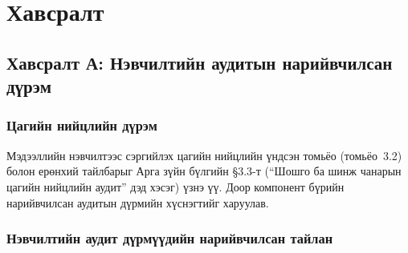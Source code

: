 
\chapter*{Хавсралт}

\captionsetup{list=no}

\section*{Хавсралт А: Нэвчилтийн аудитын нарийвчилсан дүрэм}
\label{app:leakage_audit}
\renewcommand{\thetable}{А.\arabic{table}}
\renewcommand{\thefigure}{А.\arabic{figure}}
\setcounter{table}{0}
\setcounter{figure}{0}

\subsection*{Цагийн нийцлийн дүрэм}

Мэдээллийн нэвчилтээс сэргийлэх цагийн нийцлийн үндсэн томьёо (томьёо~3.2) болон ерөнхий тайлбарыг Арга зүйн бүлгийн §3.3-т (``Шошго ба шинж чанарын цагийн нийцлийн аудит'' дэд хэсэг) үзнэ үү. Доор компонент бүрийн нарийвчилсан аудитын дүрмийн хүснэгтийг харуулав.

\subsection*{Нэвчилтийн аудит дүрмүүдийн нарийвчилсан тайлан}

